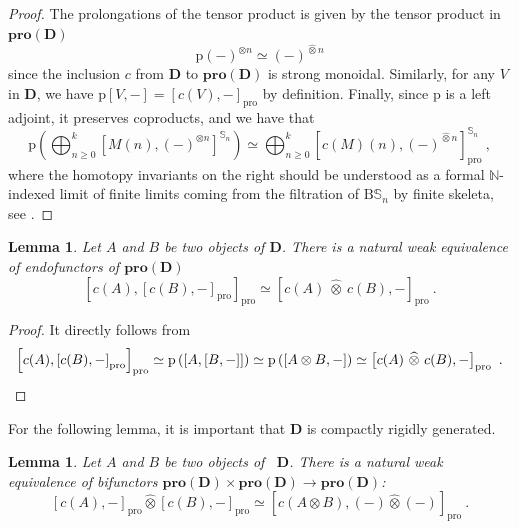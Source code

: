 \documentclass[a4paper,12pt]{amsart}
\theoremstyle{plain}
\newtheorem{lemma}[theorem]{Lemma}%
\theoremstyle{definition}
\theoremstyle{remark}
\begin{document}
\begin{proof}
The prolongations of the tensor product is given by the tensor product in $\mathbf{pro}(\mathbf{D})$ 
\[
\mathrm{p}(-)^{\otimes n} \simeq (-)^{\widehat{\otimes} n}
\]
since the inclusion $c$ from $\mathbf{D}$ to $\mathbf{pro}(\mathbf{D})$ is strong monoidal. Similarly, for any $V$ in $\mathbf{D}$, we have $ \mathrm{p}[V,-] = \left[c(V),-\right]_{\mathrm{pro}}$  by definition. 
Finally, since $\mathrm{p}$ is a left adjoint, it preserves coproducts, and we have that 
\[
\mathrm{p}\left(\bigoplus_{n \geq 0}^{k} \left[M(n),(-)^{\otimes n} \right]^{\mathbb{S}_n}\right) \simeq \bigoplus_{n \geq 0}^{k} \left[c(M)(n),(-)^{\widehat{\otimes} n} \right]^{\mathbb{S}_n}_{\mathrm{pro}}~,
\]
where the homotopy invariants on the right should be understood as a formal $\mathbb{N}$-indexed limit of finite limits coming from the filtration of $\mathrm{B}\mathbb{S}_n$ by finite skeleta, see \cite[Remark 5.2]{bachmann2024}.  
\end{proof}

\begin{lemma}\label{lemma: enriched pro-adjunction}
Let $A$ and $B$ be two objects of $\mathbf{D}$. There is a natural weak equivalence of endofunctors of $\mathbf{pro}(\mathbf{D})$
\[
\left[c(A),\left[c(B),-\right]_{\mathrm{pro}}\right]_{\mathrm{pro}} \simeq \left[c(A)~  \widehat{\otimes} ~ c(B),-\right]_{\mathrm{pro}}~. 
\]
\end{lemma}

\begin{proof}
It directly follows from 
\[
\left[c(A),\left[c(B),-\right]_{\mathrm{pro}}\right]_{\mathrm{pro}} \simeq \mathrm{p} \left( \left[A,\left[B,-\right]\right]\right) \simeq \mathrm{p} \left(\left[A \otimes B,-\right]\right) \simeq \left[c(A)~  \widehat{\otimes} ~ c(B),-\right]_{\mathrm{pro}}~.  \qedhere
\]\end{proof}
For the following lemma, it is important that $\mathbf{D}$ is compactly rigidly generated.
\begin{lemma}\label{lemma: pro-tensor and pro-enrichment}
Let $A$ and $B$ be two objects of \, $\mathbf{D}$. There is a natural weak equivalence of bifunctors $\mathbf{pro}(\mathbf{D}) \times \mathbf{pro}(\mathbf{D}) \longrightarrow \mathbf{pro}(\mathbf{D})$:
\[
\left[c(A),-\right]_{\mathrm{pro}} \widehat{\otimes} \left[c(B),-\right]_{\mathrm{pro}} \simeq \left[c(A \otimes B),(-) {\widehat{\otimes}} (-)\right]_{\mathrm{pro}}~. 
\]
\end{lemma}
\end{document}
